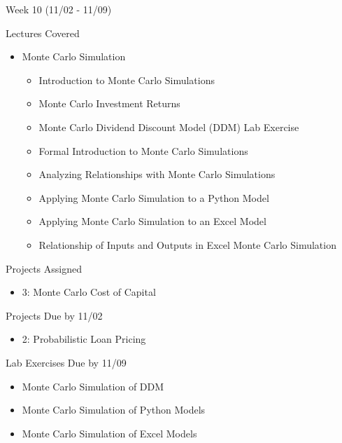 \documentclass[]{article}
\begin{document}
\begin{section}{Week 10 (11/02 - 11/09)}
\begin{subsection}{Lectures Covered}
\begin{itemize}
\item Monte Carlo Simulation
\begin{itemize}
\item Introduction to Monte Carlo Simulations
\item Monte Carlo Investment Returns
\item Monte Carlo Dividend Discount Model (DDM) Lab Exercise
\item Formal Introduction to Monte Carlo Simulations
\item Analyzing Relationships with Monte Carlo Simulations
\item Applying Monte Carlo Simulation to a Python Model
\item Applying Monte Carlo Simulation to an Excel Model
\item Relationship of Inputs and Outputs in Excel Monte Carlo Simulation
\end{itemize}
\end{itemize}
\end{subsection}
\begin{subsection}{Projects Assigned}
\begin{itemize}
\item 3: Monte Carlo Cost of Capital
\end{itemize}
\end{subsection}
\begin{subsection}{Projects Due by 11/02}
\begin{itemize}
\item 2: Probabilistic Loan Pricing
\end{itemize}
\end{subsection}
\begin{subsection}{Lab Exercises Due by 11/09}
\begin{itemize}
\item Monte Carlo Simulation of DDM
\item Monte Carlo Simulation of Python Models
\item Monte Carlo Simulation of Excel Models
\end{itemize}
\end{subsection}
\end{section}
\end{document}
